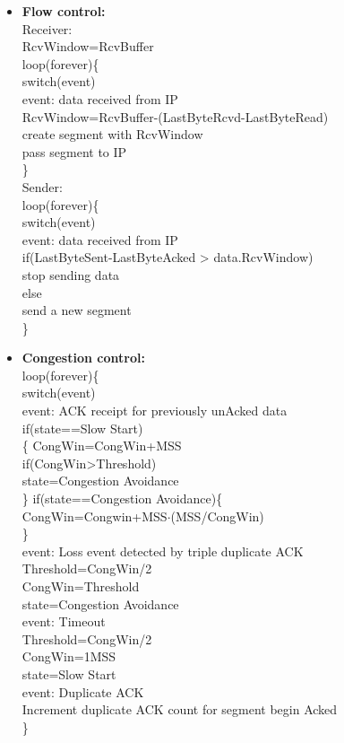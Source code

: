 \begin{itemize}
	\item
	\textbf{Flow control:}\\
	Receiver:\\
	RcvWindow=RcvBuffer\\
	loop(forever)\{\\
	switch(event)\\
	event: data received from IP\\
	RcvWindow=RcvBuffer-(LastByteRcvd-LastByteRead)\\
	create segment with RcvWindow\\
	pass segment to IP\\
	\}\\
	
	Sender:\\
	loop(forever)\{\\
	switch(event)\\
	event: data received from IP\\
	if(LastByteSent-LastByteAcked > data.RcvWindow)\\
	stop sending data\\
	else\\
	send a new segment\\
	\}\\
	
	\item
	\textbf{Congestion control:}\\
	loop(forever)\{\\
	switch(event)\\
	event: ACK receipt for previously unAcked data\\
	if(state==Slow Start)\\\{
	CongWin=CongWin+MSS\\
	if(CongWin>Threshold)\\
	state=Congestion Avoidance\\\}
	if(state==Congestion Avoidance)\{\\
	CongWin=Congwin+MSS$\cdot$(MSS/CongWin)\\
	\}\\
	event: Loss event detected by triple duplicate ACK\\
	Threshold=CongWin/2\\
	CongWin=Threshold\\
	state=Congestion Avoidance\\
	event: Timeout\\
	Threshold=CongWin/2\\
	CongWin=1MSS\\
	state=Slow Start\\
	event: Duplicate ACK\\
	Increment duplicate ACK count for segment begin Acked\\
	\}
\end{itemize}
